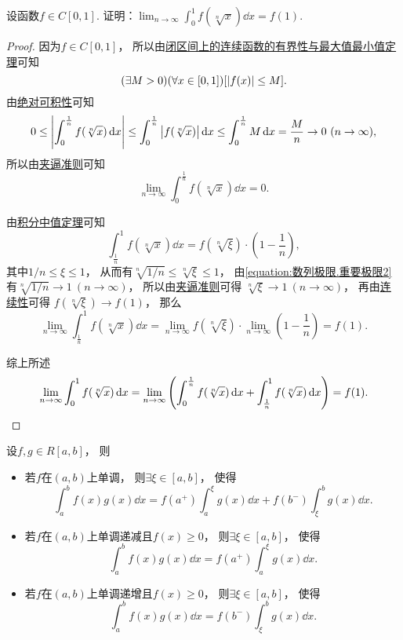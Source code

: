\begin{example}
设函数\(f \in C[0,1]\).
证明：\(\lim_{n\to\infty} \int_0^1 f(\sqrt[n]{x}) \dd{x} = f(1)\).
\begin{proof}
因为\(f \in C[0,1]\)，
所以由\hyperref[theorem:极限.最值定理]{闭区间上的连续函数的有界性与最大值最小值定理}可知\[
	(\exists M>0)
	(\forall x\in[0,1])
	[\abs{f(x)} \leq M].
\]
由\hyperref[theorem:定积分.定积分性质5推论2]{绝对可积性}可知\[
	0 \leq \abs{\int_0^{\frac1n} f(\sqrt[n]{x}) \dd{x}}
	\leq \int_0^{\frac1n} \abs{f(\sqrt[n]{x})} \dd{x}
	\leq \int_0^{\frac1n} M \dd{x}
	= \frac{M}{n}
	\to 0\ (n\to\infty),
\]
所以由\hyperref[theorem:数列极限.夹逼准则]{夹逼准则}可知
\begin{equation*}
	\lim_{n\to\infty} \int_0^{\frac1n} f(\sqrt[n]{x}) \dd{x} = 0.
\end{equation*}

由\hyperref[theorem:定积分.积分中值定理1推论2]{积分中值定理}可知\[
	\int_{\frac1n}^1 f(\sqrt[n]{x}) \dd{x}
	= f(\sqrt[n]{\xi}) \cdot \left( 1-\frac1n \right),
\]
其中\(1/n \leq \xi \leq 1\)，
从而有\(\sqrt[n]{1/n} \leq \sqrt[n]{\xi} \leq 1\)，
由\cref{equation:数列极限.重要极限2} 有\(\sqrt[n]{1/n} \to 1\ (n\to\infty)\)，
所以由\hyperref[theorem:数列极限.夹逼准则]{夹逼准则}可得
\(\sqrt[n]{\xi} \to 1\ (n\to\infty)\)，
再由\hyperref[theorem:极限.连续函数的极限3]{连续性}可得
\(f(\sqrt[n]{\xi}) \to f(1)\)，
那么\[
	\lim_{n\to\infty} \int_{\frac1n}^1 f(\sqrt[n]{x}) \dd{x}
	= \lim_{n\to\infty} f(\sqrt[n]{\xi})
		\cdot \lim_{n\to\infty} \left( 1-\frac1n \right)
	= f(1).
\]

综上所述\[
	\lim_{n\to\infty} \int_0^1 f(\sqrt[n]{x}) \dd{x}
	= \lim_{n\to\infty} \left(
		\int_0^{\frac1n} f(\sqrt[n]{x}) \dd{x}
		+ \int_{\frac1n}^1 f(\sqrt[n]{x}) \dd{x}
	\right)
	= f(1).
	\qedhere
\]
\end{proof}
\end{example}

\begin{theorem}[积分第二中值定理]\label{theorem:定积分.积分中值定理2}
设\(f,g \in R[a,b]\)，
则\begin{itemize}
	\item 若\(f\)在\((a,b)\)上单调，
	则\(\exists \xi \in [a,b]\)，
	使得\[
		\int_a^b f(x) g(x) \dd{x}
		= f(a^+) \int_a^{\xi} g(x) \dd{x} + f(b^-) \int_{\xi}^b g(x) \dd{x}.
	\]
	\item 若\(f\)在\((a,b)\)上单调递减且\(f(x) \geq 0\)，
	则\(\exists \xi \in [a,b]\)，
	使得\[
		\int_a^b f(x) g(x) \dd{x}
		= f(a^+) \int_a^{\xi} g(x) \dd{x}.
	\]
	\item 若\(f\)在\((a,b)\)上单调递增且\(f(x) \geq 0\)，
	则\(\exists \xi \in [a,b]\)，
	使得\[
		\int_a^b f(x) g(x) \dd{x}
		= f(b^-) \int_{\xi}^b g(x) \dd{x}.
	\]
\end{itemize}
\end{theorem}

